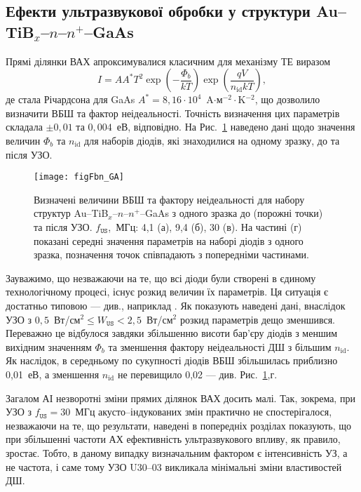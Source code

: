 \documentclass[a4paper,14pt,oneside,openany]{memoir}
\begin{document}
\subsection{Ефекти ультразвукової обробки у структури Au--TiB$_x$--$n$--$n^+$--GaAs}

Прямі ділянки ВАХ апроксимувалися класичним для механізму ТЕ виразом
\begin{equation}\label{eqIVGAMS}
  I=AA^*T^2\exp\left(-\frac{\Phi_b}{kT}\right)\exp\left(\frac{qV}{n_\mathrm{id}kT}\right),
\end{equation}
де стала Річардсона для GaAs $A^*=8,16\cdot10^4$~A$\cdot$м$^{-2}\cdot$K$^{-2}$,
що дозволило визначити ВБШ та фактор неідеальності.
Точність визначення цих параметрів складала $\pm0,01$ та $0,004$~еВ, відповідно.
На Рис.~\ref{figFbn_GA} наведено дані щодо значення величин $\Phi_b$ та $n_\mathrm{id}$
для наборів діодів, які знаходилися на одному зразку, до та після УЗО.



\begin{figure}
\center
\texttt{[image: figFbn\_GA]}%
\caption{\label{figFbn_GA}
Визначені величини ВБШ та фактору неідеальності для набору структур Au--TiB$_x$--$n$--$n^+$--GaAs
з одного зразка до (порожні точки) та після УЗО.
$f_\mathtt{US}$,~МГц: 4,1 (а), 9,4 (б), 30 (в).
На частині (г) показані середні значення параметрів на наборі діодів з одного зразка,
позначення точок співпадають з попередніми частинами.
}
\end{figure}

Зауважимо, що незважаючи на те, що всі діоди були створені в єдиному технологічному процесі,
існує розкид величин їх параметрів.
Ця ситуація є достатньо типовою --- див., наприклад \cite{SBD:rizn,Milenin1994}.
Як показують наведені дані, внаслідок УЗО з $0,5$~Вт/см$^2\leq W_\mathtt{US}<2,5$~Вт/см$^2$
розкид параметрів дещо зменшився.
Переважно це відбулося завдяки збільшенню висоти бар'єру діодів з меншим вихідним значенням $\Phi_b$ та
зменшення фактору неідеальності ДШ з більшим $n_\mathrm{id}$.
Як наслідок, в середньому по сукупності діодів ВБШ збільшилась приблизно 0,01~еВ, а зменшення $n_\mathrm{id}$ не
перевищило 0,02 --- див. Рис.~\ref{figFbn_GA},г.

Загалом АІ незворотні зміни прямих ділянок ВАХ досить малі.
Так, зокрема, при УЗО з $f_\mathtt{US}=30$~МГц акусто--індукованих змін практично не спостерігалося,
незважаючи на те, що результати, наведені в попередніх розділах показують, що при збільшенні частоти АХ
ефективність ультразвукового впливу, як правило, зростає.
Тобто, в даному випадку визначальним фактором є інтенсивність УЗ, а не частота, і саме тому УЗО U30--03
викликала мінімальні зміни властивостей ДШ.
\end{document}
